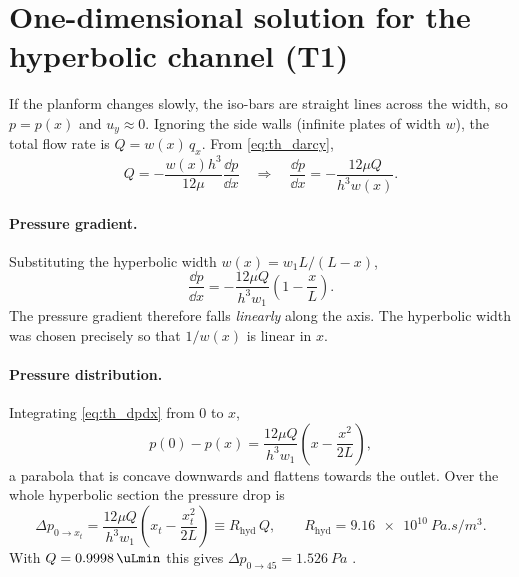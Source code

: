 \section{One-dimensional solution for the hyperbolic channel (T1)}

If the planform changes slowly, the iso-bars are straight lines across the width, so $p=p(x)$ and $u_y\approx0$. Ignoring the side walls (infinite plates of width $w$), the total flow rate is $Q=w(x)\,q_x$. From \cref{eq:th_darcy},
\begin{equation}
Q=-\frac{w(x)h^3}{12\mu}\frac{\dd p}{\dd x}
\quad\Longrightarrow\quad
\frac{\dd p}{\dd x}=-\frac{12\mu Q}{h^3w(x)} .
\label{eq:th_dpdx_general}
\end{equation}
\paragraph{Pressure gradient.} Substituting the hyperbolic width $w(x)=w_1L/(L-x)$,
\begin{equation}
\frac{\dd p}{\dd x}=-\frac{12\mu Q}{h^3w_1}\left(1-\frac{x}{L}\right).
\label{eq:th_dpdx}
\end{equation}
The pressure gradient therefore falls \emph{linearly} along the axis. The hyperbolic width was chosen precisely so that $1/w(x)$ is linear in $x$.

\paragraph{Pressure distribution.} Integrating \cref{eq:th_dpdx} from 0 to $x$,
\begin{equation}
p(0)-p(x)=\frac{12\mu Q}{h^3w_1}\left(x-\frac{x^2}{2L}\right),
\label{eq:th_p}
\end{equation}
a parabola that is concave downwards and flattens towards the outlet. Over the whole hyperbolic section the pressure drop is
\begin{equation}
\Delta p_{0\to x_t}=\frac{12\mu Q}{h^3w_1}\left(x_t-\frac{x_t^2}{2L}\right)
\equiv R_{\mathrm{hyd}}\,Q,
\qquad R_{\mathrm{hyd}}=\SI{9.16e10}{Pa.s/m^3}.
\label{eq:th_dp}
\end{equation}
With $Q=\SI{0.9998}{\uLmin}$ this gives $\Delta p_{0\to45}=\SI{1.526}{Pa}$ \tagT.


